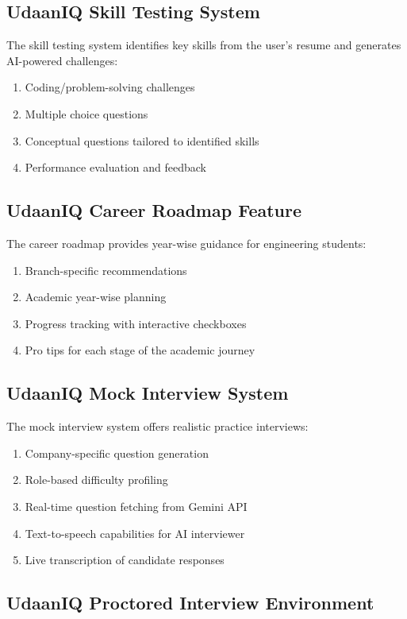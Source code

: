 \documentclass[12pt, conference]{IEEEtran}
\begin{document}
\subsection{UdaanIQ Skill Testing System}

The skill testing system identifies key skills from the user's resume and generates AI-powered challenges:
\begin{enumerate}
    \item Coding/problem-solving challenges
    \item Multiple choice questions
    \item Conceptual questions tailored to identified skills
    \item Performance evaluation and feedback
\end{enumerate}

\subsection{UdaanIQ Career Roadmap Feature}

The career roadmap provides year-wise guidance for engineering students:
\begin{enumerate}
    \item Branch-specific recommendations
    \item Academic year-wise planning
    \item Progress tracking with interactive checkboxes
    \item Pro tips for each stage of the academic journey
\end{enumerate}

\subsection{UdaanIQ Mock Interview System}

The mock interview system offers realistic practice interviews:
\begin{enumerate}
    \item Company-specific question generation
    \item Role-based difficulty profiling
    \item Real-time question fetching from Gemini API
    \item Text-to-speech capabilities for AI interviewer
    \item Live transcription of candidate responses
\end{enumerate}

\subsection{UdaanIQ Proctored Interview Environment}
\end{document}
